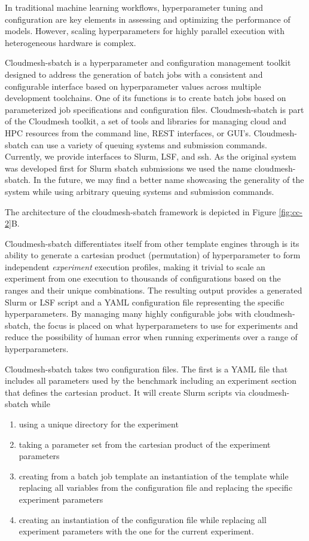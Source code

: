 \documentclass[utf8]{FrontiersinVancouver} %
\begin{document}
In traditional machine learning workflows, hyperparameter tuning and configuration are key elements in assessing and optimizing the performance of models. However, scaling hyperparameters for highly parallel execution with heterogeneous hardware is complex.

Cloudmesh-sbatch is a hyperparameter and configuration management toolkit designed to address the generation of batch jobs with a consistent and configurable interface based on hyperparameter values across multiple development toolchains. One of its functions is to create batch jobs based on parameterized job specifications and configuration files.  Cloudmesh-sbatch is part of the Cloudmesh toolkit, a set of tools and libraries for managing cloud and HPC resources from the command line, REST interfaces, or GUI's.  Cloudmesh-sbatch can use a variety of queuing systems and submission commands. Currently, we provide interfaces to Slurm, LSF, and ssh. As the original system was developed first for Slurm sbatch submissions we used the name cloudmesh-sbatch. In the future, we may find a better name showcasing the generality of the system while using arbitrary queuing systems and submission commands.

The architecture of the cloudmesh-sbatch framework is depicted in Figure \ref{fig:cc-2}B.

Cloudmesh-sbatch differentiates itself from other template engines through is its ability to generate a cartesian product (permutation) of hyperparameter to form independent {\it experiment} execution profiles, making it trivial to scale an experiment from one execution to thousands of configurations based on the ranges and their unique combinations.  The resulting output provides a generated Slurm or LSF script and a YAML configuration file representing the specific hyperparameters.  By managing many highly configurable jobs with cloudmesh-sbatch, the focus is placed on what hyperparameters to use for experiments and reduce the possibility of human error when running experiments over a range of hyperparameters.

Cloudmesh-sbatch takes two configuration files. The first is a YAML file that includes all parameters used by the benchmark including an experiment section that defines the cartesian product. It will create Slurm scripts via cloudmesh-sbatch while

\begin{enumerate}
  \item using a unique directory for the experiment
  \item taking a parameter set from the cartesian product    of the experiment parameters
  \item creating from a batch job template an instantiation of the    template while replacing all variables from the configuration file    and replacing the specific experiment parameters
  \item creating an instantiation of the configuration file while    replacing all experiment parameters with the one for the current    experiment.
\end{enumerate}
\end{document}
